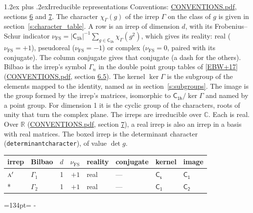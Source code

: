 \documentclass[10pt,a4paper]{article}
\makeatletter
\renewcommand\section{\@startsection{section}{1}{\z@}{-3ex plus -1ex minus -.2ex}%
  {1.2ex plus .2ex}{\normalfont\large\sffamily\bfseries\color{parttitle}}}
\newcommand{\needspace}[1]{\par\penalty-100\begingroup\dimen0=#1\relax\dimen2=\pagegoal
  \advance\dimen2-\pagetotal\ifdim\dimen0>\dimen2\relax\ifdim\dimen2>0pt\vfil\break\fi\fi
  \endgroup}
\numberwithin{equation}{section}
\newcommand{\grp}[1]{\mathsf{#1}}
\newcommand{\irr}[1]{\text{\normalfont\scshape #1}}
\newcommand{\detbox}[1]{{\setlength{\fboxsep}{1pt}\fbox{#1}}}
\newcommand{\irchar}[1]{\chi_{#1}}
\newcommand{\fsind}{\nu_{\mathrm{FS}}}
\makeatother
\begin{document}
\section{Irreducible representations}\label{s:irreps}
Conventions: \href{../../CONVENTIONS.pdf}{CONVENTIONS.pdf}, sections \href{../../CONVENTIONS.pdf\#conv.6}{6} and \href{../../CONVENTIONS.pdf\#conv.7}{7}.
\leavevmode\label{n:function.character}\label{n:irrep.Gamma}The character $\irchar{\Gamma}(g)$ of the irrep $\Gamma$ on the class of $g$ is given in section~\ref{s:character_table}.
\leavevmode\label{n:index.dimension}\label{n:index.frobenius}\label{n:head.irrep}\label{n:head.reality}A row is an irrep of dimension $d$, with its Frobenius--Schur indicator $\fsind = |\grp{C_{1h}}|^{-1}\allowbreak\sum_{g\in\grp{C_{1h}}}\irchar{\Gamma}(g^2)$, which gives its reality: real ($\fsind = +1$), pseudoreal ($\fsind = -1$) or complex ($\fsind = 0$, paired with its conjugate). \label{n:head.conjugate}The column conjugate gives that conjugate (a dash for the others). \label{n:head.bilbao}\label{n:irrep.alias.gamma}Bilbao is the irrep's symbol $\Gamma_n$ in the double point group tables of [\href{../../../REFERENCES.pdf\#ref.EBW+17}{EBW+17}] (\href{../../CONVENTIONS.pdf}{CONVENTIONS.pdf}, section \href{../../CONVENTIONS.pdf\#conv.6.5}{6.5}). \label{n:head.kernel}The kernel $\ker\Gamma$ is the subgroup of the elements mapped to the identity, named as in section~\ref{s:subgroups}. \label{n:head.image}The image is the group formed by the irrep's matrices, isomorphic to $\grp{C_{1h}}/\ker\Gamma$ and named by a point group. For dimension 1 it is the cyclic group of the characters, roots of unity that turn the complex plane. The irreps are irreducible over $\mathbb{C}$. Each is real. Over $\mathbb{R}$ (\href{../../CONVENTIONS.pdf}{CONVENTIONS.pdf}, section \href{../../CONVENTIONS.pdf\#conv.7}{7}), a real irrep is also an irrep in a basis with real matrices. \label{n:mark.determinant}The boxed irrep is the determinant character (\texttt{determinantcharacter}), of value $\det g$.
\setlength{\emergencystretch}{2em}\par\setlength{\emergencystretch}{0pt}
{\small\renewcommand{\arraystretch}{1.25}\begin{longtable}{@{}llrrllll@{}}\toprule
irrep & Bilbao & $d$ & $\fsind$ & reality & conjugate & kernel & image\\\midrule\endhead
\bottomrule\endfoot\endlastfoot
$\irr{a}'$ & $\Gamma_{1}$ & 1 & $+1$ & real & --- & \href{C1v.pdf}{$\grp{C_{s}}$} & \href{C1.pdf}{$\grp{C_{1}}$}\\*
\detbox{$\irr{a}''$} & $\Gamma_{2}$ & 1 & $+1$ & real & --- & \href{C1.pdf}{$\grp{C_{1}}$} & \href{C2.pdf}{$\grp{C_{2}}$}\\
\bottomrule\end{longtable}}
\needspace{134pt}
\end{document}
